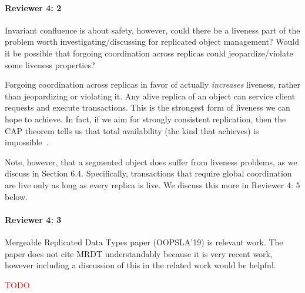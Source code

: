 \documentclass[9pt]{article}
\begin{document}
\begin{multicols*}{2}
\paragraph{Reviewer 4: 2}
\begin{feedback}
  Invariant confluence is about safety, however, could there be a liveness part
  of the problem worth investigating/discussing for replicated object
  management? Would it be possible that forgoing coordination across replicas
  could jeopardize/violate some liveness properties?
\end{feedback}
Forgoing coordination across replicas in favor of \invariantconfluence{}
actually \emph{increases} liveness, rather than jeopardizing or violating it.
Any alive replica of an \invariantconfluent{} object can service client
requests and execute transactions. This is the strongest form of liveness we
can hope to achieve. In fact, if we aim for strongly consistent replication,
then the CAP theorem tells us that total availability (the kind that
\invariantconfluence{} achieves) is impossible~\cite{brewer2012cap,
gilbert2002brewer}.

Note, however, that a segmented \invariantconfluent{} object does suffer from
liveness problems, as we discuss in Section 6.4. Specifically, transactions
that require global coordination are live only as long as every replica is
live. We discuss this more in Reviewer 4: 5 below.

\paragraph{Reviewer 4: 3}
\begin{feedback}
  Mergeable Replicated Data Types paper (OOPSLA'19) is relevant work. The paper
  does not cite MRDT understandably because it is very recent work, however
  including a discussion of this in the related work would be helpful.
\end{feedback}
\textcolor{red}{TODO.}


\end{multicols*}
\end{document}
